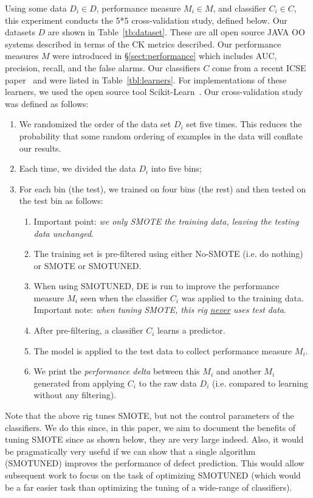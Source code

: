 \documentclass[10pt,conference]{IEEEtran}
\newcommand{\be}{\begin{enumerate}}
\newcommand{\ee}{\end{enumerate}}
\theoremstyle{break}
\theoremstyle{break}
\newcommand{\tion}[1]{{\S}\ref{sect:#1}}
\begin{document}
Using some data $D_i \in D$, performance measure $M_i \in M$, and classifier $C_i \in C$,
this experiment conducts the 5*5 cross-validation study, defined below.
Our datasets  $D$ are shown in  Table~\ref{tb:dataset}. These are all open source
JAVA OO systems described in terms of the CK metrics described. 
Our performance measures $M$ were introduced in \tion{performance}
which includes   AUC, precision, recall, and the  false alarms. 
Our classifiers
 $C$  come from a  recent ICSE paper~\cite{ghotra2015revisiting}
and were listed in  Table~\ref{tbl:learners}.
For  implementations 
of these learners,
we used  the open source tool
Scikit-Learn~\cite{pedregosa2011scikit}.
Our  cross-validation study~\cite{refaeilzadeh2009cross} was defined as follows:
\be
\item We randomized the order of the data set $D_i$ set five times. This reduces the probability
that some random ordering of examples in the data will conflate our results.
\item Each time, we divided the data $D_i$ into five bins;
\item For each bin (the test), we trained on four bins (the rest) and then tested
on the test bin as follows:
\be
\item
Important point: {\em we only SMOTE the training data,  leaving
the  testing data unchanged}.
\item
The  training set is pre-filtered using either No-SMOTE (i.e. do nothing) or  SMOTE or SMOTUNED.  
\item
When using SMOTUNED, DE is  run to  improve
the performance measure $M_i$ seen when the classifier $C_i$ was applied to the training data.
Important note: {\em when tuning SMOTE, this rig \underline{{\em never}} uses test data}.
\item
After pre-filtering, a classifier $C_i$  learns a predictor.
\item
The model is applied to the test data to collect performance measure $M_i$. 
\item 
We print the {\em performance delta} between this $M_i$ and another  $M_i$
generated from applying $C_i$ to the raw data $D_i$ (i.e. compared to learning
without any filtering).
\ee
\ee


   
   
Note that the above rig tunes SMOTE, but not the control parameters of the classifiers.
We do this since, in this paper,  we aim to document the   benefits of tuning SMOTE since as shown below, they are very large indeed. Also, it would be  pragmatically very useful if we can show that a single algorithm (SMOTUNED)  improves the performance of defect prediction. This would allow
subsequent work to focus on the task of optimizing  SMOTUNED (which would be a far easier
task than optimizing the tuning of a wide-range of classifiers). 
 
\end{document}
